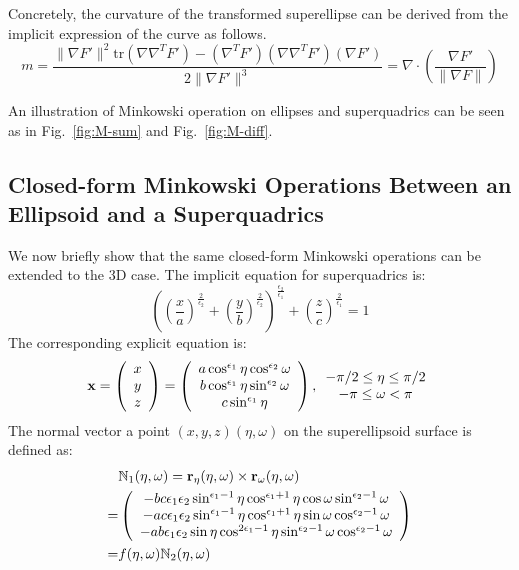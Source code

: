 \documentclass[]{article}
\newcommand{\tr}{\mbox{tr}}
\newcommand{\epa}{{\epsilon_1}}
\newcommand{\epb}{{\epsilon_2}}
\begin{document}
Concretely, the curvature of the transformed superellipse can be derived from the implicit expression of the curve as follows.
\begin{equation}
m = \frac{\| \nabla F' \|^2 \tr(\nabla \nabla^T F') - (\nabla^T F')(\nabla \nabla^T F')(\nabla F')}{2 \| \nabla F' \|^3} = \nabla \cdot (\frac{\nabla F'}{\| \nabla F \|})
\end{equation}

An illustration of Minkowski operation on ellipses and superquadrics can be seen as in Fig.~\ref{fig:M-sum} and Fig.~\ref{fig:M-diff}.

\subsection{Closed-form Minkowski Operations Between an Ellipsoid and a Superquadrics}
We now briefly show that the same closed-form Minkowski operations can be extended to the 3D case. The implicit equation for superquadrics is:
\begin{equation}
\left( \left( \dfrac{x}{a} \right)^{\frac{2}{\epb}} +
\left( \dfrac{y}{b}\right)^{\frac{2}{\epb}}
\right)^{\frac{\epsilon_2}{\epsilon_1}}
+
\left( \dfrac{z}{c}\right)^{\frac{2}{\epsilon_1}} = 1
\label{superquadrics}
\end{equation}
The corresponding explicit equation is:
\begin{equation}
{\bf x} =
\left(
\begin{array}{c}
x \\
y \\
z
\end{array}
\right)
=
\left(
\begin{array}{c}
a\cos^{\epsilon_1} \eta \cos^{\epsilon_2} \omega \\
b\cos^{\epsilon_1} \eta \sin^{\epsilon_2} \omega \\
c\sin^{\epsilon_1} \eta
\end{array}
\right)
,
\begin{array}{c}
-\pi/2 \leq \eta \leq \pi/2 \\
- \pi \leq \omega < \pi
\end{array}
\end{equation}
The normal vector a point $(x,y,z)(\eta, \omega)$ on the superellipsoid surface is defined as:
\begin{equation}
\begin{split}
& \mathbb{N}_1(\eta, \omega) = {\bf r}_{\eta}(\eta, \omega) \times {\bf r}_{\omega}(\eta, \omega) \\
=&\left(
\begin{array}{c}
-bc \epa \epb\sin^{\epa - 1}\eta \cos^{\epa + 1}\eta \cos\omega\sin^{\epb - 1}\omega\\
-ac \epa \epb\sin^{\epa - 1}\eta \cos^{\epa + 1}\eta \sin\omega\cos^{\epb - 1}\omega\\
-ab \epa \epb\sin\eta \cos^{2\epa - 1}\eta \sin^{\epb - 1}\omega\cos^{\epb - 1}\omega
\end{array}
\right) \\
=& f(\eta, \omega) \mathbb{N}_2(\eta, \omega)
\end{split}
\end{equation}
\end{document}
